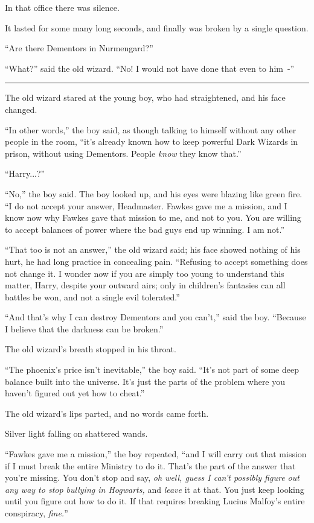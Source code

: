In that office there was silence.

It lasted for some many long seconds, and finally was broken by a single question.

``Are there Dementors in Nurmengard?''

``What?'' said the old wizard. ``No! I would not have done that even to him~-''

\begin{center}\rule{3in}{0.4pt}\end{center}

The old wizard stared at the young boy, who had straightened, and his face changed.

``In other words,'' the boy said, as though talking to himself without any other people in the room, ``it's already known how to keep powerful Dark Wizards in prison, without using Dementors. People \emph{know} they know that.''

``Harry...?''

``No,'' the boy said. The boy looked up, and his eyes were blazing like green fire. ``I do not accept your answer, Headmaster. Fawkes gave me a mission, and I know now why Fawkes gave that mission to me, and not to you. You are willing to accept balances of power where the bad guys end up winning. I am not.''

``That too is not an answer,'' the old wizard said; his face showed nothing of his hurt, he had long practice in concealing pain. ``Refusing to accept something does not change it. I wonder now if you are simply too young to understand this matter, Harry, despite your outward airs; only in children's fantasies can all battles be won, and not a single evil tolerated.''

``And that's why I can destroy Dementors and you can't,'' said the boy. ``Because I believe that the darkness can be broken.''

The old wizard's breath stopped in his throat.

``The phoenix's price isn't inevitable,'' the boy said. ``It's not part of some deep balance built into the universe. It's just the parts of the problem where you haven't figured out yet how to cheat.''

The old wizard's lips parted, and no words came forth.

Silver light falling on shattered wands.

``Fawkes gave me a mission,'' the boy repeated, ``and I will carry out that mission if I must break the entire Ministry to do it. That's the part of the answer that you're missing. You don't stop and say, \emph{oh well, guess I can't possibly figure out any way to stop bullying in Hogwarts,} and \emph{leave} it at that. You just keep looking until you figure out how to do it. If that requires breaking Lucius Malfoy's entire conspiracy, \emph{fine.}''

